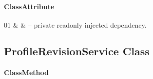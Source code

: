 \paragraph{ClassAttribute}
\begin{ClassAttributeTable}
01 &  &  -- private readonly injected dependency. \\ \hline
\end{ClassAttributeTable}

\subsection{ProfileRevisionService Class}
\label{cls:nhuy-ProfileRevisionService}

\paragraph{ClassMethod}
